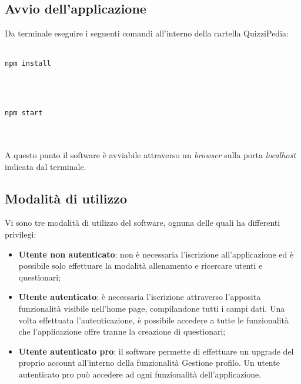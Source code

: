 \subsection{Avvio dell'applicazione}
Da terminale eseguire i seguenti comandi all'interno della cartella QuizziPedia:\\
\\
\centerline{\texttt{npm install}}\\
\\
\centerline{\texttt{npm start}}\\
\\
A questo punto il software è avviabile attraverso un \textit{browser} sulla porta \textit{localhost} indicata dal terminale.

\subsection{Modalità di utilizzo}
Vi sono tre modalità di utilizzo del software, ognuna delle quali ha differenti privilegi:
\begin{itemize}
	\item \textbf{Utente non autenticato}: non è necessaria l'iscrizione all'applicazione ed è possibile solo effettuare la modalità allenamento e ricercare utenti e questionari;
	\item \textbf{Utente autenticato}: è necessaria l'iscrizione attraverso l'apposita funzionalità visibile nell'home page, compilandone tutti i campi dati. Una volta effettuata l'autenticazione, è possibile accedere a tutte le funzionalità che l'applicazione offre tranne la creazione di questionari;
	\item \textbf{Utente autenticato pro}: il software permette di effettuare un upgrade del proprio account all'interno della funzionalità Gestione profilo. Un utente autenticato pro può accedere ad ogni funzionalità dell'applicazione. 
\end{itemize}

